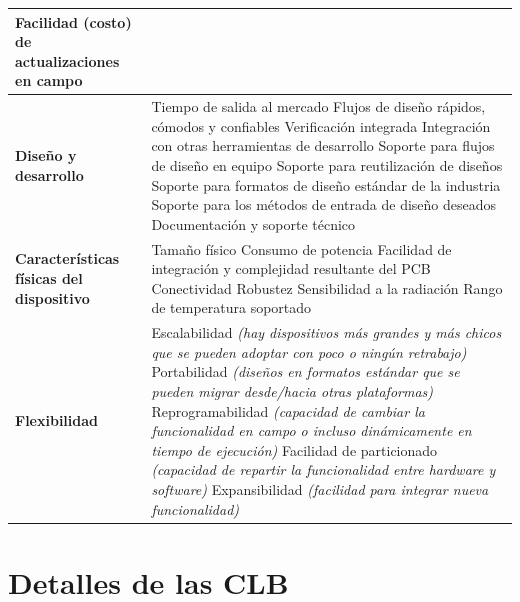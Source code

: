 {\begin{longtable}{|>{\raggedright\arraybackslash}p{}%
  |>{\raggedright\arraybackslash}p{}|}
  Facilidad (costo) de actualizaciones en campo \\ \hline
\textbf{Diseño y desarrollo} & Tiempo de salida al mercado\newline
  Flujos de diseño rápidos, cómodos y confiables\newline
  Verificación integrada\newline
  Integración con otras herramientas de desarrollo\newline
  Soporte para flujos de diseño en equipo\newline
  Soporte para reutilización de diseños\newline
  Soporte para formatos de diseño estándar de la industria\newline
  Soporte para los métodos de entrada de diseño deseados\newline
  Documentación y soporte técnico \\ \hline
\textbf{Características físicas del dispositivo} & Tamaño físico\newline
  Consumo de potencia\newline
  Facilidad de integración y complejidad resultante del PCB\newline
  Conectividad\newline
  Robustez\newline
  Sensibilidad a la radiación\newline
  Rango de temperatura soportado \\ \hline
\textbf{Flexibilidad} & Escalabilidad \emph{(hay dispositivos más grandes y más
  chicos que se pueden adoptar con poco o ningún retrabajo)}\newline
  Portabilidad \emph{(diseños en formatos estándar que se pueden migrar
  desde/hacia otras plataformas)}\newline
  Reprogramabilidad \emph{(capacidad de cambiar la funcionalidad en campo o
  incluso dinámicamente en tiempo de ejecución)}\newline
  Facilidad de particionado \emph{(capacidad de repartir la funcionalidad entre
  hardware y software)}\newline
  Expansibilidad \emph{(facilidad para integrar nueva funcionalidad)} \\ \hline
\end{longtable}}

\section{Detalles de las CLB}
\label{S:ap-hw-clb}

